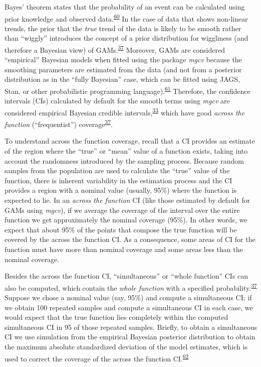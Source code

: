 \documentclass[
]{article}
\begin{document}
Bayes' theorem states that the probability of an event can be calculated using prior knowledge and observed data.\textsuperscript{\protect\hyperlink{ref-mcelreath2018}{60}} In the case of data that shows non-linear trends, the prior that the \emph{true} trend of the data is likely to be smooth rather than ``wiggly'' introduces the concept of a prior distribution for wiggliness (and therefore a Bayesian view) of GAMs.\textsuperscript{\protect\hyperlink{ref-wood2017}{37}} Moreover, GAMs are considered ``empirical'' Bayesian models when fitted using the package \emph{mgcv} because the smoothing parameters are estimated from the data (and not from a posterior distribution as in the ``fully Bayesian'' case, which can be fitted using JAGS, Stan, or other probabilistic programming language).\textsuperscript{\protect\hyperlink{ref-miller2019}{61}} Therefore, the confidence intervals (CIs) calculated by default for the smooth terms using \emph{mgcv} are considered empirical Bayesian credible intervals,\textsuperscript{\protect\hyperlink{ref-pedersen2019}{33}} which have good \emph{across the function} (``frequentist'') coverage\textsuperscript{\protect\hyperlink{ref-wood2017}{37}}.

To understand across the function coverage, recall that a CI provides an estimate of the region where the ``true'' or ``mean'' value of a function exists, taking into account the randomness introduced by the sampling process. Because random samples from the population are used to calculate the ``true'' value of the function, there is inherent variability in the estimation process and the CI provides a region with a nominal value (usually, 95\%) where the function is expected to lie. In an \emph{across the function} CI (like those estimated by default for GAMs using \emph{mgcv}), if we average the coverage of the interval over the entire function we get approximately the nominal coverage (95\%). In other words, we expect that about 95\% of the points that compose the true function will be covered by the across the function CI. As a consequence, some areas of CI for the function must have more than nominal coverage and some areas less than the nominal coverage.

Besides the across the function CI, ``simultaneous'' or ``whole function'' CIs can also be computed, which contain the \emph{whole function} with a specified probability.\textsuperscript{\protect\hyperlink{ref-wood2017}{37}} Suppose we chose a nominal value (say, 95\%) and compute a simultaneous CI; if we obtain 100 repeated samples and compute a simultaneous CI in each case, we would expect that the true function lies completely within the computed simultaneous CI in 95 of those repeated samples. Briefly, to obtain a simultaneous CI we use simulation from the empirical Bayesian posterior distribution to obtain the maximum absolute standardized deviation of the model estimates, which is used to correct the coverage of the across the function CI.\textsuperscript{\protect\hyperlink{ref-ruppert2003}{62}}
\end{document}
